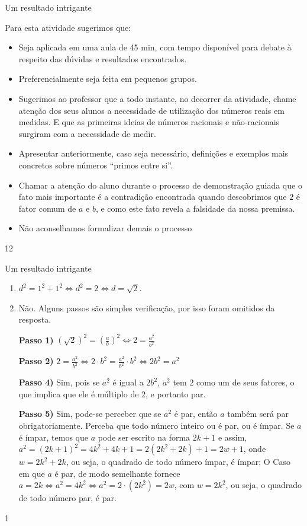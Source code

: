 \begin{sugestions}{Um resultado intrigante}
{
Para esta atividade sugerimos que:
\begin{itemize}
\item {} 
Seja aplicada em uma aula de 45 min, com tempo disponível para debate à respeito das dúvidas e resultados encontrados.

\item {} 
Preferencialmente seja feita em pequenos grupos.

\item {} 
Sugerimos ao professor que a todo instante, no decorrer da atividade, chame atenção dos seus alunos a necessidade de utilização dos números reais em medidas. E que as primeiras ideias de números racionais e não-racionais surgiram com a necessidade de medir.

\item {} 
Apresentar anteriormente, caso seja necessário, definições e exemplos mais concretos sobre números “primos entre si”.

\item {} 
Chamar a atenção do aluno durante o processo de demonstração guiada que o fato mais importante é a contradição encontrada quando descobrimos que \(2\) é fator comum de \(a\) e \(b\), e como este fato revela a falsidade da nossa premissa.

\item {} 
Não aconselhamos formalizar demais o processo

\end{itemize}
}{1}{2}
\end{sugestions}
\clearmargin
\begin{answer}{Um resultado intrigante}
{
\begin{enumerate}
\item {} 
\(d^2 = 1^2 + 1^2  \Leftrightarrow d^2=2 \Leftrightarrow d=\sqrt{2}\).

\item {} 
Não. Alguns passos são simples verificação, por isso foram omitidos da resposta.

\textbf{Passo 1)} \((\sqrt{2})^2=(\frac{a}{b})^2\Leftrightarrow 2=\frac{a^2}{b^2}\)

\textbf{Passo 2)} \(2=\frac{a^2}{b^2} \Leftrightarrow 2\cdot b^2 = \frac{a^2}{b^2}\cdot b^2 \Leftrightarrow 2b^2=a^2\)

\textbf{Passo 4)} Sim, pois se \(a^2\) é igual a \(2b^2\), \(a^2\) tem \(2\) como um de seus fatores, o que implica que ele é múltiplo de \(2\), e portanto par.

\textbf{Passo 5)} Sim, pode-se perceber que se \(a^2\) é par, então \(a\) também será par obrigatoriamente. Perceba que todo número inteiro ou é par, ou é ímpar. Se \(a\) é ímpar, temos que \(a\) pode ser escrito na forma \(2k+1\) e assim, \(a^2 = (2k+1)^2 = 4k^2 + 4k + 1 = 2(2k^2 + 2k) + 1 = 2w + 1\), onde \(w= 2k^2+2k\), ou seja, o quadrado de todo número ímpar, é ímpar; O Caso em que \(a\) é par, de modo semelhante fornece \(a = 2k \Leftrightarrow a^2 = 4k^2 \Leftrightarrow a^2 = 2 \cdot (2k^2) = 2w\), com \(w=2k^2\), ou seja, o quadrado de todo número par, é par.

\end{enumerate}
}{1}
\end{answer}
